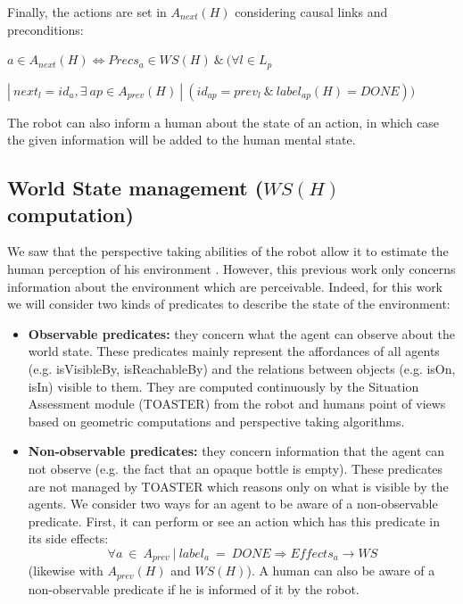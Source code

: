 \documentclass[english,a4paper,11pt,twoside]{StyleThese}
\begin{document}
Finally, the actions are set in $A_{next}(H)$ considering causal links and preconditions:

\begin{center}
$a \in A_{next}(H) \Leftrightarrow Precs_{a} \in WS(H) \ \& \ (\forall l \in L_p$ 

$| \ next_l = id_a, \exists \ ap \in A_{prev}(H) \ | \ (id_{ap} = prev_l \ \& \ label_{ap}(H)  = DONE))$
\end{center}

The robot can also inform a human about the state of an action, in which case the given information will be added to the human mental state.

\subsection{World State management ($WS(H)$ computation)}
\label{subsec:worldstate}

We saw that the perspective taking abilities of the robot allow it to estimate the human perception of his environment \cite{milliez2014framework}. However, this previous work only concerns information about the environment which are perceivable. Indeed, for this work we will consider two kinds of predicates to describe the state of the environment:
\begin{itemize}
\item \textbf{Observable predicates:} they concern what the agent can observe about the world state. These predicates mainly represent the affordances of all agents (e.g. isVisibleBy, isReachableBy) and the relations between objects (e.g. isOn, isIn) visible to them. They are computed continuously by the Situation Assessment module (TOASTER) from the robot and humans point of views based on geometric computations and perspective taking algorithms.
\item \textbf{Non-observable predicates:} they concern information that the agent can not observe (e.g. the fact that an opaque bottle is empty). These predicates are not managed by TOASTER which reasons only on what is visible by the agents. We consider two ways for an agent to be aware of a non-observable predicate. First, it can perform or see an action which has this predicate in its side effects:
$$\forall a \ \in \ A_{prev} \ | \ label_{a} \ = \ DONE \Rightarrow Effects_{a} \rightarrow WS$$
(likewise with $A_{prev}(H)$ and $WS(H)$). A human can also be aware of a non-observable predicate if he is informed of it by the robot.
\end{itemize}
\end{document}
